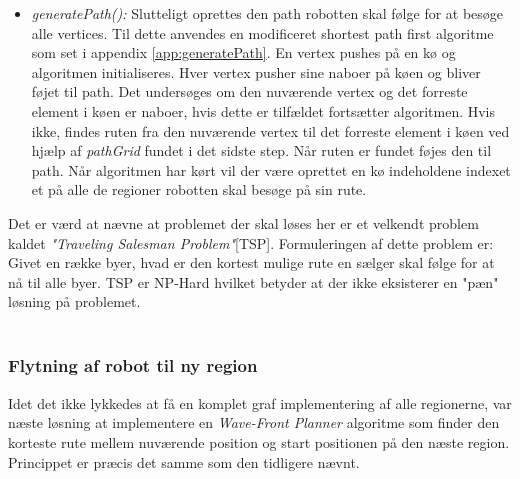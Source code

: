 \begin{itemize}
	 \item \emph{generatePath():} Slutteligt oprettes den path robotten skal følge for at besøge alle vertices. Til dette anvendes en modificeret shortest path first algoritme som set i appendix \ref{app:generatePath}. En vertex pushes på en kø og algoritmen initialiseres. Hver vertex pusher sine naboer på køen og bliver føjet til path. Det undersøges om den nuværende vertex og det forreste element i køen er naboer, hvis dette er tilfældet fortsætter algoritmen. Hvis ikke, findes ruten fra den nuværende vertex til det forreste element i køen ved hjælp af \emph{pathGrid} fundet i det sidste step. Når ruten er fundet føjes den til path. Når algoritmen har kørt vil der være oprettet en kø indeholdene indexet et på alle de regioner robotten skal besøge på sin rute.
\end{itemize}
Det er værd at nævne at problemet der skal løses her er et velkendt problem kaldet \textit{"Traveling Salesman Problem"}[TSP]. Formuleringen af dette problem er: Givet en række byer, hvad er den kortest mulige rute en sælger skal følge for at nå til alle byer. TSP er NP-Hard hvilket betyder at der ikke eksisterer en "pæn" løsning på problemet. \\~\\


\subsubsection{Flytning af robot til ny region}






Idet det ikke lykkedes at få en komplet graf implementering af alle regionerne, var næste løsning at implementere en \emph{Wave-Front Planner} algoritme som finder den korteste rute mellem nuværende position og start positionen på den næste region. Princippet er præcis det samme som den tidligere nævnt.



